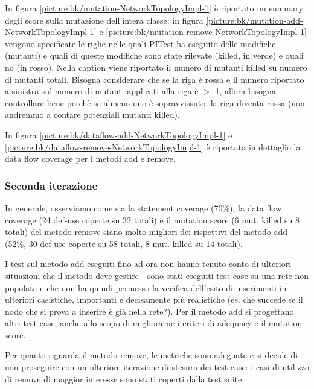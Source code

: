 \documentclass[10pt, a4paper]{article}
\newcommand{\getpicturelabel}[1]{picture:#1}
\begin{document}
	In figura \ref{\getpicturelabel{bk/mutation-NetworkTopologyImpl-1}} è riportato un summary degli
	score sulla mutazione dell'intera classe: in figura \ref{\getpicturelabel{bk/mutation-add-NetworkTopologyImpl-1}} 
	e \ref{\getpicturelabel{bk/mutation-remove-NetworkTopologyImpl-1}} vengono
	specificate le righe nelle quali PITest ha eseguito delle modifiche (mutanti) e quali di queste 
	modifiche sono state rilevate (killed, in verde) e quali no (in rosso). Nella caption viene 
	riportato
	il numero di mutanti killed su numero di mutanti totali. Bisogna considerare che se la riga è rossa
	e il numero riportato a sinistra sul numero di mutanti applicati alla riga è $>$ 1, allora bisogna
	controllare bene perchè se almeno uno è sopravvissuto, la riga diventa rossa (non andremmo a contare
	potenziali mutanti killed).
	
	In figura \ref{\getpicturelabel{bk/dataflow-add-NetworkTopologyImpl-1}} e 
	\ref{\getpicturelabel{bk/dataflow-remove-NetworkTopologyImpl-1}} 
	è riportata in dettaglio la data flow coverage per i metodi add e remove.
	
	\subsubsection{Seconda iterazione}
	In generale, osserviamo come sia la statement coverage (70\%), la data flow coverage (24 def-use 
	coperte su 32 totali) e il mutation
	score (6 mut. killed su 8 totali) del metodo remove siano molto migliori dei rispettivi del metodo
	add (52\%, 30 def-use coperte su 58 totali, 8 mut. killed su 14 totali).
	
	I test sul metodo add eseguiti fino ad ora non hanno tenuto conto
	di ulteriori situazioni che il metodo deve gestire - sono stati eseguiti test case su una rete
	non popolata e che non ha quindi permesso la verifica dell'esito di inserimenti in ulteriori 
	casistiche, importanti e decisamente più realistiche 
	(es. che succede se il nodo che si prova a inserire è già nella rete?). Per il metodo add si
	progettano altri test case, anche allo scopo di migliorarne i criteri di adequacy e il mutation score.
	
	Per quanto riguarda il metodo remove, le metriche sono adeguate e si decide di non proseguire 
	con un ulteriore iterazione di stesura dei test case: i casi di utilizzo di remove di maggior interesse
	sono stati coperti dalla test suite.
	
\end{document}
